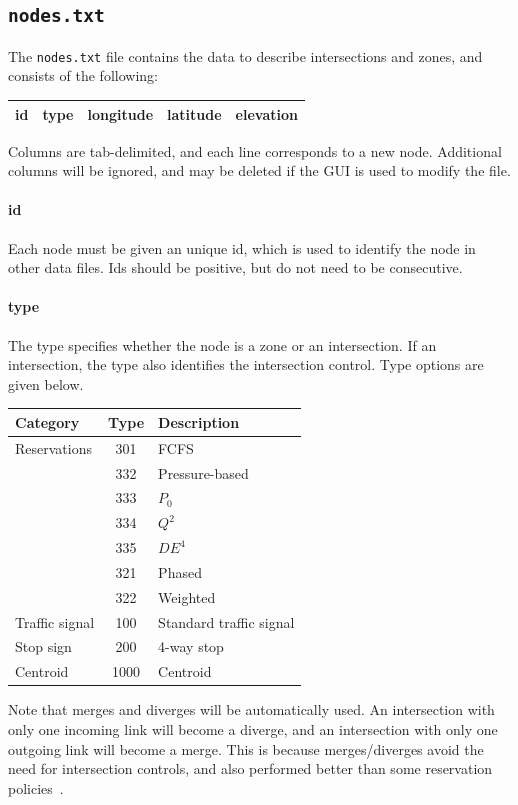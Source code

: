 \subsection{\texttt{nodes.txt}}
The \texttt{nodes.txt} file contains the data to describe intersections and zones, and consists of the following:
\begin{center}
\begin{tabular}{ccccc}
\hline
id & type & longitude & latitude  & elevation \\\hline
\end{tabular}
\end{center}
Columns are tab-delimited, and each line corresponds to a new node. Additional columns will be ignored, and may be deleted if the GUI is used to modify the file.

\paragraph*{id}
Each node must be given an unique id, which is used to identify the node in other data files. Ids should be positive, but do not need to be consecutive.

\paragraph*{type}
The type specifies whether the node is a zone or an intersection. If an intersection, the type also identifies the intersection control. Type options are given below.
\begin{center}
\begin{tabular}{lcl}
\hline
Category & Type & Description\\\hline
Reservations & 301 & FCFS\\
& 332 & Pressure-based\\
& 333 & $P_0$\\
& 334 & $Q^2$~\cite{levin2015optimizing}\\
& 335 & $DE^4$~\cite{levin2015optimizing}\\
& 321 & {\sc Phased}\\
& 322 & {\sc Weighted}\\\hline
Traffic signal & 100 & Standard traffic signal\\\hline
Stop sign & 200 & 4-way stop \\\hline
Centroid & 1000 & Centroid\\\hline
\end{tabular}
\end{center}
Note that merges and diverges will be automatically used. An intersection with only one incoming link will become a diverge, and an intersection with only one outgoing link will become a merge. This is because merges/diverges avoid the need for intersection controls, and also performed better than some reservation policies~\cite{levin2016paradoxes}.


